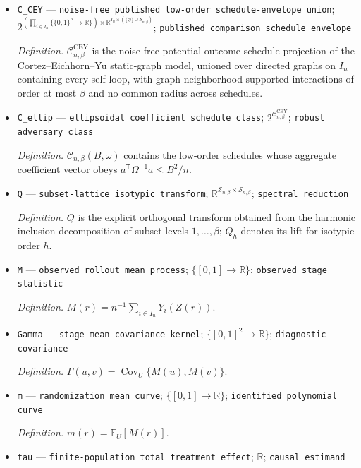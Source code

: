 \documentclass{article}
\begin{document}
\begin{itemize}
  \item \texttt{C\_\allowbreak{}CEY} --- \texttt{noise-\allowbreak{}free published low-\allowbreak{}order schedule-\allowbreak{}envelope union}; \(2^{(\prod_{i\in I_n}\{\{0,1\}^n\to\mathbb R\})\times\mathbb R^{I_n\times(\{\varnothing\}\cup\mathcal S_{n,\beta})}}\); \texttt{published comparison schedule envelope}
  \par\smallskip\noindent\emph{Definition.} \(\mathcal C^{\mathrm{CEY}}_{n,\beta}\) is the noise-free potential-outcome-schedule projection of the Cortez--Eichhorn--Yu static-graph model, unioned over directed graphs on \(I_n\) containing every self-loop, with graph-neighborhood-supported interactions of order at most \(\beta\) and no common radius across schedules.
  \item \texttt{C\_\allowbreak{}ellip} --- \texttt{ellipsoidal coefficient schedule class}; \(2^{\mathcal C^{\mathrm{CEY}}_{n,\beta}}\); \texttt{robust adversary class}
  \par\smallskip\noindent\emph{Definition.} \(\mathcal C_{n,\beta}(B,\omega)\) contains the low-order schedules whose aggregate coefficient vector obeys \(a^{\mathsf T}\Omega^{-1}a\le B^2/n\).
  \item \texttt{Q} --- \texttt{subset-\allowbreak{}lattice isotypic transform}; \(\mathbb R^{\mathcal S_{n,\beta}\times\mathcal S_{n,\beta}}\); \texttt{spectral reduction}
  \par\smallskip\noindent\emph{Definition.} \(Q\) is the explicit orthogonal transform obtained from the harmonic inclusion decomposition of subset levels \(1,\ldots,\beta\); \(Q_h\) denotes its lift for isotypic order \(h\).
  \item \texttt{M} --- \texttt{observed rollout mean process}; \(\{[0,1]\to\mathbb R\}\); \texttt{observed stage statistic}
  \par\smallskip\noindent\emph{Definition.} \(M(r)=n^{-1}\sum_{i\in I_n}Y_i(Z(r))\).
  \item \texttt{Gamma} --- \texttt{stage-\allowbreak{}mean covariance kernel}; \(\{[0,1]^2\to\mathbb R\}\); \texttt{diagnostic covariance}
  \par\smallskip\noindent\emph{Definition.} \(\Gamma(u,v)=\operatorname{Cov}_U\{M(u),M(v)\}\).
  \item \texttt{m} --- \texttt{randomization mean curve}; \(\{[0,1]\to\mathbb R\}\); \texttt{identified polynomial curve}
  \par\smallskip\noindent\emph{Definition.} \(m(r)=\mathbb E_U[M(r)]\).
  \item \texttt{tau} --- \texttt{finite-\allowbreak{}population total treatment effect}; \(\mathbb R\); \texttt{causal estimand}

\end{itemize}
\end{document}
